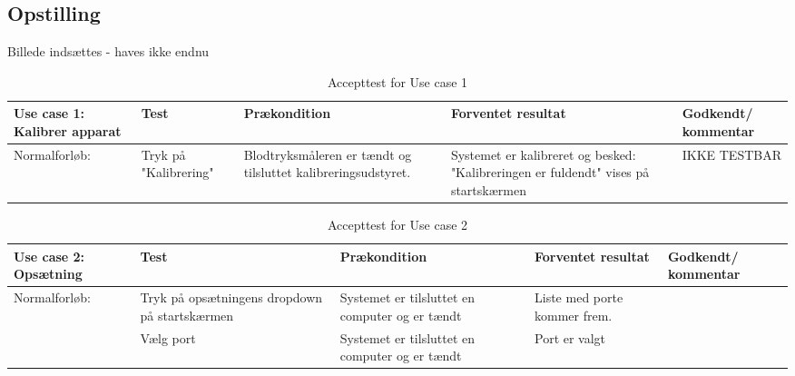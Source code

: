 \subsection{Opstilling}
Billede indsættes - haves ikke endnu

\begin{table}[H]
\caption{Accepttest for Use case 1}\label{tab:tabel8}
\begin{tabular}{|>{\raggedright\arraybackslash}p{2.5cm}| >{\raggedright\arraybackslash}p{2.9cm} | >{\raggedright\arraybackslash}p{2.9cm} | >{\raggedright\arraybackslash}p{2.9cm} | >{\raggedright\arraybackslash}p{2.8cm} |}
   \hline
   \textbf{Use case 1: Kalibrer apparat} &\textbf{Test}& \textbf{Prækondition} & \textbf{Forventet resultat} & \textbf{Godkendt/ kommentar}\\ \hline
   Normalforløb:& Tryk på "Kalibrering" & Blodtryksmåleren er tændt og tilsluttet kalibreringsudstyret. & Systemet er kalibreret og besked: "Kalibreringen er fuldendt" vises på startskærmen & IKKE TESTBAR\\\hline
\end{tabular}
\end{table}

\begin{table}[H]
\caption{Accepttest for Use case 2}\label{tab:tabel8}
\begin{tabular}{|>{\raggedright\arraybackslash}p{2.5cm}| >{\raggedright\arraybackslash}p{2.9cm} | >{\raggedright\arraybackslash}p{2.9cm} | >{\raggedright\arraybackslash}p{2.9cm} | >{\raggedright\arraybackslash}p{2.8cm} |}
   \hline
   \textbf{Use case 2: Opsætning} &\textbf{Test}& \textbf{Prækondition} & \textbf{Forventet resultat} & \textbf{Godkendt/ kommentar}\\ \hline
   Normalforløb:& Tryk på opsætningens dropdown på startskærmen & Systemet er tilsluttet en computer og er tændt & Liste med porte kommer frem. & \\\hline
   &Vælg port & Systemet er tilsluttet en computer og er tændt & Port er valgt &\\\hline
\end{tabular}
\end{table}

